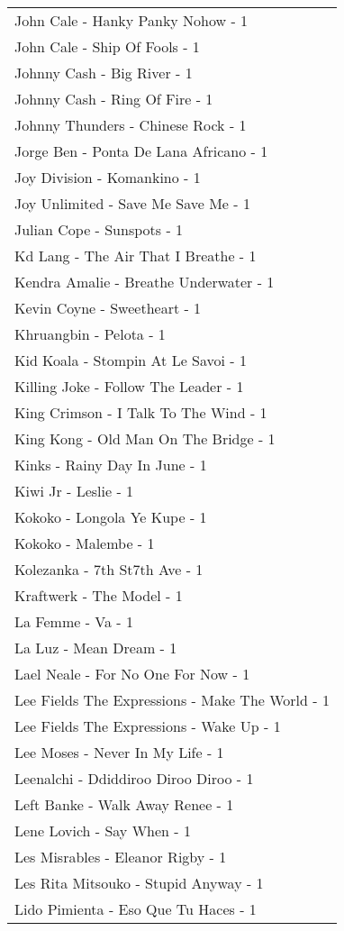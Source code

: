 \documentclass[
]{article}
\begin{document}
\begin{longtable}{l}
John Cale - Hanky Panky Nohow - 1 \\ 
John Cale - Ship Of Fools - 1 \\ 
Johnny Cash - Big River - 1 \\ 
Johnny Cash - Ring Of Fire - 1 \\ 
Johnny Thunders - Chinese Rock - 1 \\ 
Jorge Ben - Ponta De Lana Africano - 1 \\ 
Joy Division - Komankino - 1 \\ 
Joy Unlimited - Save Me Save Me - 1 \\ 
Julian Cope - Sunspots - 1 \\ 
Kd Lang - The Air That I Breathe - 1 \\ 
Kendra Amalie - Breathe Underwater - 1 \\ 
Kevin Coyne - Sweetheart - 1 \\ 
Khruangbin - Pelota - 1 \\ 
Kid Koala - Stompin At Le Savoi - 1 \\ 
Killing Joke - Follow The Leader - 1 \\ 
King Crimson - I Talk To The Wind - 1 \\ 
King Kong - Old Man On The Bridge - 1 \\ 
Kinks - Rainy Day In June - 1 \\ 
Kiwi Jr - Leslie - 1 \\ 
Kokoko - Longola Ye Kupe - 1 \\ 
Kokoko - Malembe - 1 \\ 
Kolezanka - 7th St7th Ave - 1 \\ 
Kraftwerk - The Model - 1 \\ 
La Femme - Va - 1 \\ 
La Luz - Mean Dream - 1 \\ 
Lael Neale - For No One For Now - 1 \\ 
Lee Fields The Expressions - Make The World - 1 \\ 
Lee Fields The Expressions - Wake Up - 1 \\ 
Lee Moses - Never In My Life - 1 \\ 
Leenalchi - Ddiddiroo Diroo Diroo - 1 \\ 
Left Banke - Walk Away Renee - 1 \\ 
Lene Lovich - Say When - 1 \\ 
Les Misrables - Eleanor Rigby - 1 \\ 
Les Rita Mitsouko - Stupid Anyway - 1 \\ 
Lido Pimienta - Eso Que Tu Haces - 1 \\ 

\end{longtable}
\end{document}
